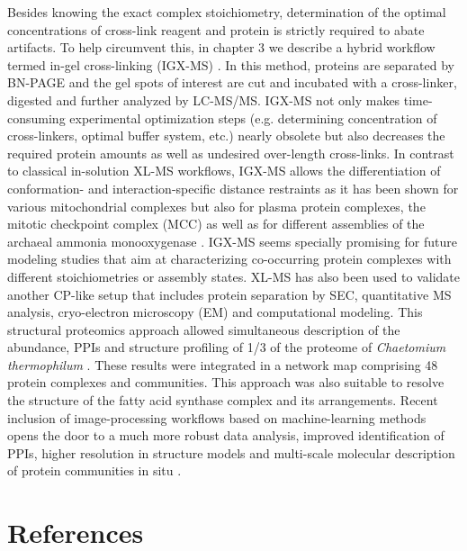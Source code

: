 Besides knowing the exact complex stoichiometry, determination of the optimal concentrations of cross-link reagent and protein is strictly required to abate artifacts. To help circumvent this, in chapter 3 we describe a hybrid workflow termed in-gel cross-linking (IGX-MS) \cite{Hevler_2021a}. In this method, proteins are separated by BN-PAGE and the gel spots of interest are cut and incubated with a cross-linker, digested and further analyzed by LC-MS/MS. IGX-MS not only makes time-consuming experimental optimization steps (e.g. determining concentration of cross-linkers, optimal buffer system, etc.) nearly obsolete but also decreases the required protein amounts as well as undesired over-length cross-links. In contrast to classical in-solution XL-MS workflows, IGX-MS allows the differentiation of conformation- and interaction-specific distance restraints as it has been shown for various mitochondrial complexes but also for plasma protein complexes, the mitotic checkpoint complex (MCC) as well as for different assemblies of the archaeal ammonia monooxygenase \cite{Fischer_2022, Hevler_2021a, Hodgskiss_2022, Lukassen_2021}. IGX-MS seems specially promising for future modeling studies that aim at characterizing co-occurring protein complexes with different stoichiometries or assembly states.
XL-MS has also been used to validate another CP-like setup that includes protein separation by SEC, quantitative MS analysis, cryo-electron microscopy (EM) and computational modeling. This structural proteomics approach allowed simultaneous description of the abundance, PPIs and structure profiling of 1/3 of the proteome of \emph{Chaetomium thermophilum} \cite{Kastritis_2017}. These results were integrated in a network map comprising 48 protein complexes and communities. This approach was also suitable to resolve the structure of the fatty acid synthase complex and its arrangements. Recent inclusion of image-processing workflows based on machine-learning methods opens the door to a much more robust data analysis, improved identification of PPIs, higher resolution in structure models and multi-scale molecular description of protein communities in situ \cite{Kyrilis_2021a}.
\newpage
\section*{References}



